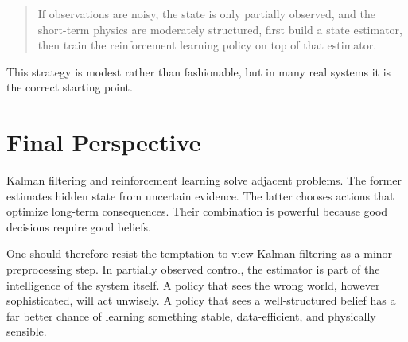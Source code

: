 \documentclass[12pt,a4paper]{article}
\begin{document}
\begin{quote}
If observations are noisy, the state is only partially observed, and the short-term physics are moderately structured, first build a state estimator, then train the reinforcement learning policy on top of that estimator.
\end{quote}

This strategy is modest rather than fashionable, but in many real systems it is the correct starting point.

\section{Final Perspective}

Kalman filtering and reinforcement learning solve adjacent problems. The former estimates hidden state from uncertain evidence. The latter chooses actions that optimize long-term consequences. Their combination is powerful because good decisions require good beliefs.

One should therefore resist the temptation to view Kalman filtering as a minor preprocessing step. In partially observed control, the estimator is part of the intelligence of the system itself. A policy that sees the wrong world, however sophisticated, will act unwisely. A policy that sees a well-structured belief has a far better chance of learning something stable, data-efficient, and physically sensible.
\end{document}
